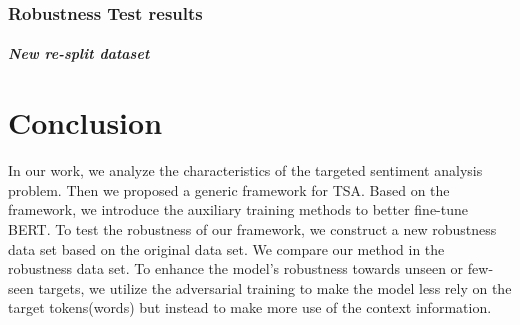 \documentclass[fyp]{socreport}
\begin{document}
\subsection{Robustness Test results}

\paragraph{New re-split dataset}






\begin{table}[tp]
    \small
    \centering
  \end{table}



\chapter{Conclusion}
In our work, we analyze the characteristics of the targeted sentiment analysis problem. Then we proposed a generic framework for TSA. Based on the framework, we introduce the auxiliary training methods to better fine-tune BERT. To test the robustness of our framework, we construct a new robustness data set based on the original data set. We compare our method in the robustness data set. To enhance the model's robustness towards unseen or few-seen targets, we utilize the adversarial training to make the model less rely on the target tokens(words) but instead to make more use of the context information.
\end{document}
